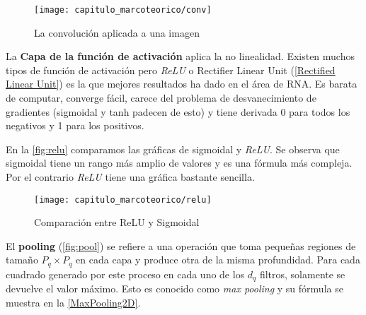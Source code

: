 

\begin{figure}[H]
    \centering
    \texttt{[image: capitulo\_marcoteorico/conv]}
    \caption{La convolución aplicada a una imagen}\label{fig:conv}
\end{figure}

La \textbf{Capa de la función de activación} aplica la no linealidad. Existen
muchos tipos de función de activación pero \emph{ReLU} o Rectifier Linear Unit
(\autoref{Rectified Linear Unit}) es la que mejores resultados ha dado en el
área de RNA. Es barata de computar, converge fácil, carece del problema de
desvanecimiento de gradientes (sigmoidal y tanh padecen de esto) y tiene
derivada 0 para todos los negativos y 1 para los positivos.



En la \autoref{fig:relu} comparamos las gráficas de sigmoidal y \emph{ReLU}. Se
observa que sigmoidal tiene un rango más amplio de valores y es una fórmula más
compleja. Por el contrario \emph{ReLU} tiene una gráfica bastante sencilla.

\begin{figure}[H]
    \centering
    \texttt{[image: capitulo\_marcoteorico/relu]}
    \caption{Comparación entre ReLU y Sigmoidal}\label{fig:relu}
\end{figure}

El \textbf{pooling} (\autoref{fig:pool}) se refiere a una operación que toma
pequeñas regiones de tamaño $P_{q} \times P_{q}$ en cada capa y produce otra de
la misma profundidad. Para cada cuadrado generado por este proceso en cada uno
de los $d_{q}$ filtros, solamente se devuelve el valor máximo. Esto es conocido
como \emph{max pooling} y su fórmula se muestra en la \autoref{MaxPooling2D}.

